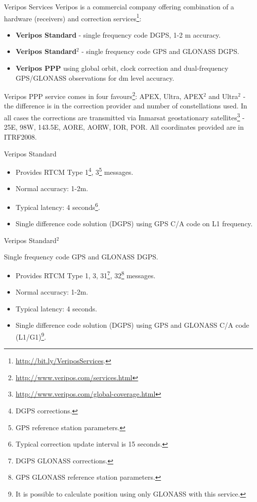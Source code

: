 \documentclass[11pt]{beamer}
\begin{document}
\begin{frame}[allowframebreaks]{Veripos Services}
	Veripos is a commercial company offering combination of a hardware (receivers) and correction services\footnote[frame]{\url{http://bit.ly/VeriposServices}.}:
	
	\begin{itemize}
		\item \textbf{Veripos Standard} - single frequency code DGPS, 1-2 m accuracy.
		\item \textbf{Veripos Standard$^2$ } - single frequency code GPS and GLONASS DGPS. 
		\item \textbf{Veripos PPP} using global orbit, clock correction and dual-frequency GPS/GLONASS observations for dm level accuracy.
	\end{itemize}

	Veripos PPP service comes in four favours\footnote[frame]{\url{http://www.veripos.com/services.html}}: APEX, Ultra, APEX$^2$ and Ultra$^2$ - the difference is in the correction provider and number of constellations used. In all cases the corrections are transmitted via Inmarsat geostationary satellites\footnote[frame]{\url{http://www.veripos.com/global-coverage.html}} - 25E, 98W, 143.5E, AORE, AORW, IOR, POR. All coordinates provided are in ITRF2008.
\end{frame}


\begin{frame}{Veripos Standard}
	
	\begin{itemize}	
		\item Provides RTCM Type 1\footnote{DGPS corrections.}, 3\footnote{GPS reference station parameters.} messages.
		\item Normal accuracy: 1-2m. 
		\item Typical latency: 4 seconds\footnote{Typical correction update interval is 15 seconds.}.
		\item Single difference code solution (DGPS) using GPS C/A code on L1 frequency.
	\end{itemize}	
	
\end{frame}


\begin{frame}{Veripos Standard$^2$}
	
	Single frequency code GPS and GLONASS DGPS. 

	\begin{itemize}	
		\item Provides RTCM Type 1, 3, 31\footnote{DGPS GLONASS corrections.}, 32\footnote{GPS GLONASS reference station parameters.} messages.
		\item Normal accuracy: 1-2m. 
		\item Typical latency: 4 seconds.
		\item Single difference code solution (DGPS) using GPS and GLONASS C/A code (L1/G1)\footnote[frame]{It is possible to calculate position using only GLONASS with this service.}.
	\end{itemize}	
	
\end{frame}
\end{document}
